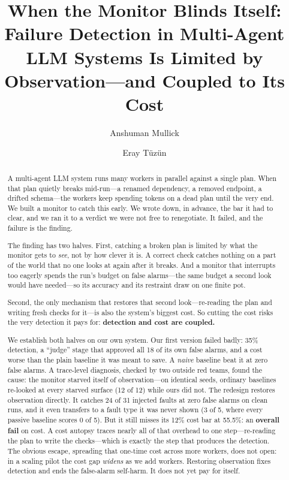 \documentclass[acmsmall,screen]{acmart}
\begin{document}
\title{When the Monitor Blinds Itself: Failure Detection in Multi-Agent LLM
Systems Is Limited by Observation---and Coupled to Its Cost}

\author{Anshuman Mullick}

\author{Eray T\"uz\"un}

\begin{abstract}
A multi-agent LLM system runs many workers in parallel against a single plan.
When that plan quietly breaks mid-run---a renamed dependency, a removed
endpoint, a drifted schema---the workers keep spending tokens on a dead plan
until the very end. We built a monitor to catch this early. We wrote down, in
advance, the bar it had to clear, and we ran it to a verdict we were not free
to renegotiate. It failed, and the failure is the finding.

The finding has two halves. First, catching a broken plan is limited by what
the monitor gets to \emph{see}, not by how clever it is. A correct check
catches nothing on a part of the world that no one looks at again after it
breaks. And a monitor that interrupts too eagerly spends the run's budget on
false alarms---the same budget a second look would have needed---so its
accuracy and its restraint draw on one finite pot.

Second, the only mechanism that restores that second look---re-reading the plan
and writing fresh checks for it---is also the system's biggest cost. So cutting
the cost risks the very detection it pays for: \textbf{detection and cost are
coupled.}

We establish both halves on our own system. Our first version failed badly:
35\% detection, a ``judge'' stage that approved all 18 of its own false alarms,
and a cost worse than the plain baseline it was meant to save. A \emph{naive}
baseline beat it at zero false alarms. A trace-level diagnosis, checked by two
outside red teams, found the cause: the monitor starved itself of
observation---on identical seeds, ordinary baselines re-looked at every starved
surface (12 of 12) while ours did not. The redesign restores observation
directly. It catches 24 of 31 injected faults at zero false alarms on clean
runs, and it even transfers to a fault type it was never shown (3 of 5, where
every passive baseline scores 0 of 5). But it still misses its 12\% cost bar at
55.5\%: an \textbf{overall fail} on cost. A cost autopsy traces nearly all of
that overhead to one step---re-reading the plan to write the checks---which is
exactly the step that produces the detection. The obvious escape, spreading
that one-time cost across more workers, does not open: in a scaling pilot the
cost gap \emph{widens} as we add workers. Restoring observation fixes detection
and ends the false-alarm self-harm. It does not yet pay for itself.


\end{abstract}
\end{document}
